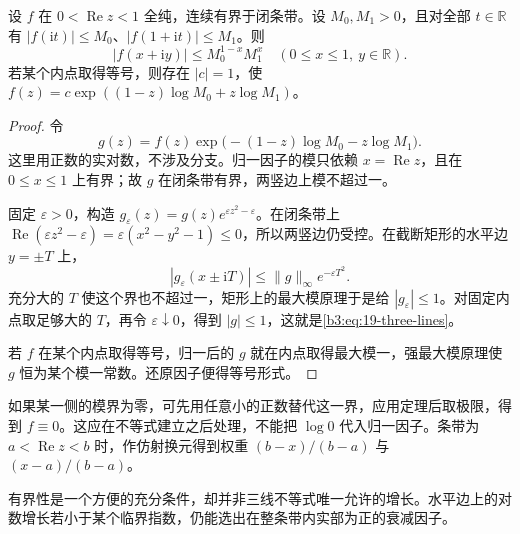 \begin{theorem}[有界函数的三线不等式]\label{b3:thm:19-three-lines}
设 \(f\) 在 \(0<\operatorname{Re}z<1\) 全纯，连续有界于闭条带。设 \(M_0,M_1>0\)，且对全部 \(t\in\mathbb R\) 有
\( |f(\mathrm it)|\le M_0\)、\( |f(1+\mathrm it)|\le M_1\)。则
\begin{equation}\label{b3:eq:19-three-lines}
 |f(x+\mathrm iy)|\le M_0^{1-x}M_1^x
 \quad(0\le x\le1,\ y\in\mathbb R).
\end{equation}
若某个内点取得等号，则存在 \(|c|=1\)，使
\(f(z)=c\exp((1-z)\log M_0+z\log M_1)\)。
\end{theorem}
\begin{proof}
令
\[
 g(z)=f(z)\exp\bigl(-(1-z)\log M_0-z\log M_1\bigr).
\]
这里用正数的实对数，不涉及分支。归一因子的模只依赖 \(x=\operatorname{Re}z\)，且在 \(0\le x\le1\) 上有界；故 \(g\) 在闭条带有界，两竖边上模不超过一。

固定 \(\varepsilon>0\)，构造
\(g_\varepsilon(z)=g(z)e^{\varepsilon z^2-\varepsilon}\)。在闭条带上
\(\operatorname{Re}(\varepsilon z^2-\varepsilon)=\varepsilon(x^2-y^2-1)\le0\)，所以两竖边仍受控。在截断矩形的水平边 \(y=\pm T\) 上，
\[
 |g_\varepsilon(x\pm\mathrm iT)|\le\|g\|_\infty e^{-\varepsilon T^2}.
\]
充分大的 \(T\) 使这个界也不超过一，矩形上的最大模原理于是给 \(|g_\varepsilon|\le1\)。对固定内点取足够大的 \(T\)，再令 \(\varepsilon\downarrow0\)，得到 \(|g|\le1\)，这就是\eqref{b3:eq:19-three-lines}。

若 \(f\) 在某个内点取得等号，归一后的 \(g\) 就在内点取得最大模一，强最大模原理使 \(g\) 恒为某个模一常数。还原因子便得等号形式。
\end{proof}

如果某一侧的模界为零，可先用任意小的正数替代这一界，应用定理后取极限，得到 \(f\equiv0\)。这应在不等式建立之后处理，不能把 \(\log0\) 代入归一因子。条带为 \(a<\operatorname{Re}z<b\) 时，作仿射换元得到权重 \((b-x)/(b-a)\) 与 \((x-a)/(b-a)\)。

\ProseParagraphBreak

有界性是一个方便的充分条件，却并非三线不等式唯一允许的增长。水平边上的对数增长若小于某个临界指数，仍能选出在整条带内实部为正的衰减因子。

